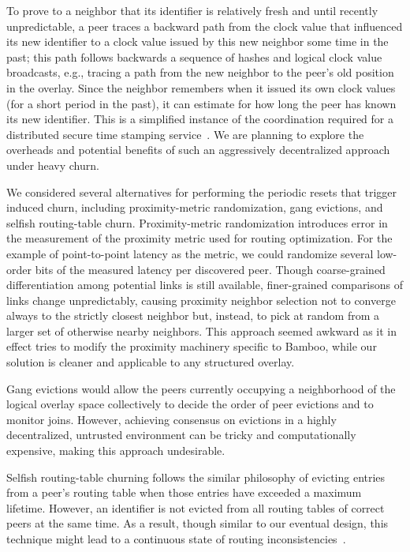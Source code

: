 \documentclass[10pt,twocolumn]{article}
\begin{document}
To prove to a neighbor that its identifier is relatively fresh and until
recently unpredictable, a peer traces a backward path from the clock
value that influenced its new identifier to a clock value issued by this
new neighbor some time in the past; this path follows backwards a
sequence of hashes and logical clock value broadcasts, e.g., tracing a
path from the new neighbor to the peer's old position in the overlay.
Since the neighbor remembers when it issued its own clock values (for a
short period in the past), it can estimate for how long the peer has
known its new identifier.  This is a simplified instance of the
coordination required for a distributed secure time stamping
service~\cite{Maniatis2002b}.  We are planning to explore the
overheads and potential benefits of such an aggressively decentralized
approach under heavy churn.


We considered several alternatives for performing the periodic resets 
that trigger induced churn, including proximity-metric randomization, 
gang evictions, and selfish routing-table churn.  Proximity-metric 
randomization introduces error in the
measurement of the proximity metric used for routing optimization.  For the
example of point-to-point latency as the metric, we could randomize
several low-order bits of the measured latency per discovered peer.
Though coarse-grained differentiation among potential links
is still available, finer-grained comparisons of links change
unpredictably, causing proximity neighbor selection not to
converge always to the strictly closest neighbor  but, instead, to pick
at random from a larger set of otherwise nearby neighbors.  This
approach seemed awkward as it in effect tries to modify the proximity machinery
specific to Bamboo, while our solution is cleaner and applicable to any structured overlay.

Gang evictions would allow the peers currently occupying a neighborhood of the
logical overlay space collectively to decide the order of peer evictions and to
monitor joins. However, achieving consensus on evictions in a highly
decentralized, untrusted environment can be tricky and computationally
expensive, making this approach undesirable.

Selfish routing-table churning follows the similar philosophy of evicting entries
from a peer's routing table when those entries have exceeded a maximum
lifetime.  However, an identifier is not evicted from all routing tables
of correct peers at the same time.  As a result, though similar to our
eventual design, this
technique might lead to a continuous state of routing
inconsistencies~\cite{Liben2002short}.
\end{document}
